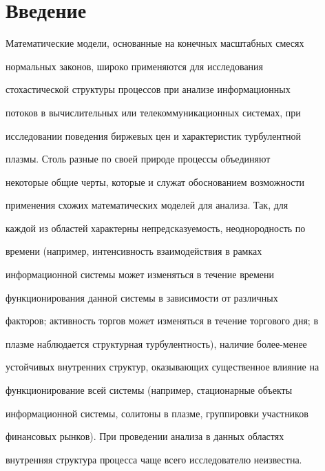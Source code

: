       \thispagestyle{headings}



      

            \label{st\stat}







\section{Введение}



Математические модели, основанные на конечных масштабных смесях

нормальных законов, широко применяются для исследования

стохастической структуры процессов при анализе информационных

потоков в вычислительных или телекоммуникационных системах, при

исследовании поведения биржевых цен и характеристик турбулентной

плазмы. Столь разные по своей природе процессы объединяют

некоторые общие черты, которые и служат обоснованием воз\-мож\-ности

применения схожих математических моделей для анализа. Так, для

каждой из областей характерны непредсказуемость, неоднородность по

времени (например, интенсивность взаимодействия в рамках

информационной системы может изменяться в течение времени

функционирования данной системы в зависимости от различных

факторов; активность торгов может изменяться в течение торгового дня; в

плазме наблюдается структурная турбулентность), наличие более-менее

устойчивых внутренних структур, оказывающих существенное влияние на

функционирование всей системы (например, стационарные объекты

информационной системы, солитоны в плазме, группировки участников

финансовых рынков). При проведении анализа в данных областях

внутренняя структура процесса чаще всего исследователю неизвестна.



